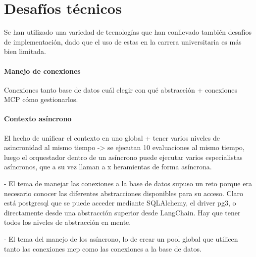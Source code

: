 \section{Desafíos técnicos}
Se han utilizado una variedad de tecnologías que han conllevado también desafíos de implementación, dado que el uso de estas en la carrera universitaria es más bien limitada.

\paragraph{Manejo de conexiones}
Conexiones tanto base de datos cuál elegir con qué abstracción + conexiones MCP cómo gestionarlos.

\paragraph{Contexto asíncrono}
El hecho de unificar el contexto en uno global + tener varios niveles de asincronidad al mismo tiempo -> se ejecutan 10 evaluaciones al mismo tiempo, luego el orquestador dentro de un asíncrono puede ejecutar varios especialistas asíncronos, que a su vez llaman a x heramientas de forma asíncrona. 


- El tema de manejar las conexiones a la base de datos supuso un reto porque era necesario conocer las diferentes abstracciones disponibles para su acceso. Claro está postgresql que se puede acceder mediante SQLAlchemy, el driver pg3, o directamente desde una abstracción superior desde LangChain. Hay que tener todos los niveles de abstracción en mente. 

- El tema del manejo de los asíncrono, lo de crear un pool global que utilicen tanto las conexiones mcp como las conexiones a la base de datos.

